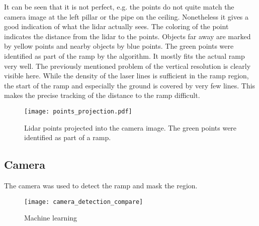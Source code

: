 It can be seen that it is not perfect, e.g. the points do not quite match the camera image at the left pillar or the pipe on the ceiling.
Nonetheless it gives a good indication of what the \gls{lidar} actually sees.
The coloring of the point indicates the distance from the \gls{lidar} to the points.
Objects far away are marked by yellow points and nearby objects by blue points.
The green points were identified as part of the ramp by the algorithm.
It mostly fits the actual ramp very well.
The previously mentioned problem of the vertical resolution is clearly visible here.
While the density of the laser lines is sufficient in the ramp region, the start of the ramp and especially the ground is covered by very few lines.
This makes the precise tracking of the distance to the ramp difficult.
\begin{figure}[htbp]
    \centering
    \texttt{[image: points\_projection.pdf]}
    \caption{Lidar points projected into the camera image. The green points were identified as part of a ramp.}
    \label{fig:points_projection}
\end{figure}



\subsection{Camera}
The camera was used to detect the ramp and mask the region.
\begin{figure}[htbp]
    \centering
    \texttt{[image: camera\_detection\_compare]}
    \caption{Machine learning}
    \label{fig:camera_detection_compare}
\end{figure}